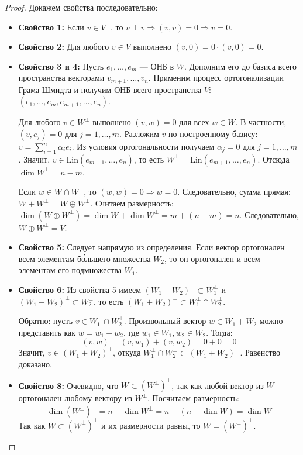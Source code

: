 \begin{proof}
	Докажем свойства последовательно:
	\begin{itemize}
		\item \textbf{Свойство 1:} Если $v \in V^\perp$, то $v \perp v \Rightarrow (v, v) = 0 \Rightarrow v = 0$.
		\item \textbf{Свойство 2:} Для любого $v \in V$ выполнено $(v, 0) = 0 \cdot (v, 0) = 0$.
		\item \textbf{Свойство 3 и 4:} Пусть $e_1, \dots, e_m$ — ОНБ в $W$. Дополним его до базиса всего пространства векторами $v_{m+1}, \dots, v_n$. Применим процесс ортогонализации Грама-Шмидта и получим ОНБ всего пространства $V$: $(e_1, \dots, e_m, e_{m+1}, \dots, e_n)$.
		
		Для любого $v \in W^\perp$ выполнено $(v, w) = 0$ для всех $w \in W$. В частности, $(v, e_j) = 0$ для $j = 1, \dots, m$. 
		Разложим $v$ по построенному базису: $v = \sum_{i=1}^n \alpha_i e_i$. Из условия ортогональности получаем $\alpha_j = 0$ для $j = 1, \dots, m$. 
		Значит, $v \in \mathrm{Lin}(e_{m+1}, \dots, e_n)$, то есть $W^\perp = \mathrm{Lin}(e_{m+1}, \dots, e_n)$. Отсюда $\dim W^\perp = n - m$.
		
		Если $w \in W \cap W^\perp$, то $(w, w) = 0 \Rightarrow w = 0$. Следовательно, сумма прямая: $W + W^\perp = W \oplus W^\perp$.
		Считаем размерность: $\dim(W \oplus W^\perp) = \dim W + \dim W^\perp = m + (n - m) = n$. Следовательно, $W \oplus W^\perp = V$.
		
		\item \textbf{Свойство 5:} Следует напрямую из определения. Если вектор ортогонален всем элементам б\'ольшего множества $W_2$, то он ортогонален и всем элементам его подмножества $W_1$.
		
		\item \textbf{Свойство 6:} Из свойства 5 имеем $(W_1 + W_2)^\perp \subset W_1^\perp$ и $(W_1 + W_2)^\perp \subset W_2^\perp$, то есть $(W_1 + W_2)^\perp \subset W_1^\perp \cap W_2^\perp$.
		
		Обратно: пусть $v \in W_1^\perp \cap W_2^\perp$. Произвольный вектор $w \in W_1 + W_2$ можно представить как $w = w_1 + w_2$, где $w_1 \in W_1, w_2 \in W_2$. Тогда:
		\[
		(v, w) = (v, w_1) + (v, w_2) = 0 + 0 = 0
		\]
		Значит, $v \in (W_1 + W_2)^\perp$, откуда $W_1^\perp \cap W_2^\perp \subset (W_1 + W_2)^\perp$. Равенство доказано.
		
		\item \textbf{Свойство 8:} Очевидно, что $W \subset (W^\perp)^\perp$, так как любой вектор из $W$ ортогонален любому вектору из $W^\perp$. 
		Посчитаем размерность:
		\[
		\dim(W^\perp)^\perp = n - \dim W^\perp = n - (n - \dim W) = \dim W
		\]
		Так как $W \subset (W^\perp)^\perp$ и их размерности равны, то $W = (W^\perp)^\perp$.
		

\end{itemize}
\end{proof}
